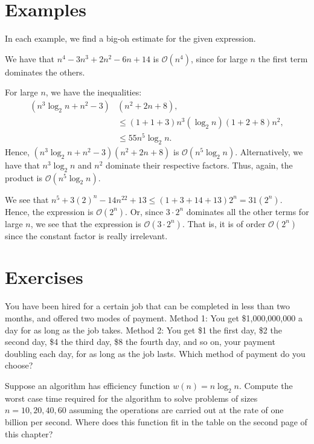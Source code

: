 \section{Examples}
In each example, we find a big-oh estimate for the given expression.
\begin{exmp}
We have that
$n^4-3n^3+2n^2-6n+14$ is $\mathcal{O}(n^4)$, since for large $n$ the first term dominates
the others.
\end{exmp}

\begin{exmp}
 For large $n$, we have the inequalities:
\begin{align*}
(n^3\log_2 n+n^2-3)&(n^2+2n+8), \\
 &\leq(1+1+3)n^3(\log_2{n})(1+2+8)n^2, \\
 &\leq55n^5\log_2n.
\end{align*}
Hence, $(n^3\log_2 n+n^2-3)(n^2+2n+8)$ is $\mathcal{O}(n^5\log_2n)$. Alternatively, we have
that $n^3\log_{2}n$ and $n^2$ dominate their respective factors. Thus, again, the
product is $\mathcal{O}(n^5\log_2n)$.
\end{exmp}

\begin{exmp}
 We see that $n^{5}+3(2)^n-14n^{22}+13\leq(1+3+14+13)2^n= 31(2^n)$.
Hence, the expression is $\mathcal{O}(2^n)$. Or, since $3\cdot2^n$ dominates all the other terms
for large $n$, we see that the expression is $\mathcal{O}(3\cdot2^n)$. That is, it is of order
$\mathcal{O}(2^n)$ since the constant factor is really irrelevant.
\end{exmp}


\clearpage

\section{Exercises}

\begin{exer} 
You have been hired for a certain job that can be completed in less 
than two months, and offered two modes of
payment. Method 1: You get \$1,000,000,000 a day for as long as the 
job takes. Method 2: You get \$1 the first day, \$2 the second day,
\$4 the third day, \$8 the fourth day, and so on, your payment doubling
each day, for as long as the job lasts. Which method of payment do you choose?
\end{exer}

\begin{exer} 
Suppose an algorithm has efficiency function $w(n) = n\log_2{n}$.
Compute the worst case time required for the algorithm to solve problems
of sizes $n=10,20,40,60$ assuming the operations are carried out at
the rate of one billion per second. Where does this function fit
in the table on the second page of this chapter?
\end{exer}

